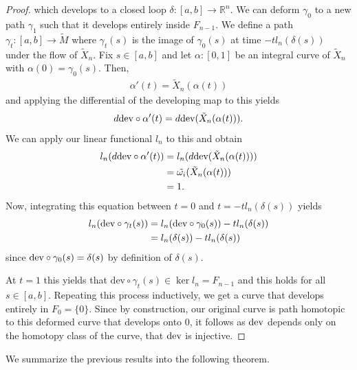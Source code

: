 \begin{proof}
    which develops to a closed loop $\delta: [a,b] \to \mathbb{R}^n$. We can deform
    $\gamma_0$ to a new path $\gamma_1$ such that it develops entirely inside
    $F_{n-1}$. We define a path $\gamma_t : [a,b] \to \tilde{M}$ where
    $\gamma_t(s)$ is the image of $\gamma_0(s)$ at time $-tl_n(\delta(s))$ under
    the flow of $\tilde{X}_n$. Fix $s \in [a,b]$ and let $\alpha: [0,1]$ be an
    integral curve of $\tilde{X}_n$ with $\alpha(0) = \gamma_0(s)$. Then,
    \begin{align*}
        \alpha'(t) = \tilde{X}_n(\alpha(t))
    \end{align*}
    and applying the differential of the developing map to this yields
    \begin{align*}
        d\text{dev} \circ \alpha' (t) = d \text{dev}(\tilde{X}_n(\alpha(t))).
    \end{align*}
    We can apply our linear functional $l_n$ to this and obtain
    \begin{align*}
        l_n(d\text{dev} \circ \alpha' (t) ) & = l_n(d \text{dev}(\tilde{X}_n(\alpha(t))))      \\
                                      & = \tilde{\omega_i}(\tilde{X}_n(\alpha(t))) \\
                                      & = 1.
    \end{align*}
    Now, integrating this equation between $t=0$ and $t = -tl_n(\delta(s))$ yields
    \begin{align*}
        l_n(\text{dev} \circ \gamma_t(s)) & = l_n(\text{dev} \circ \gamma_0(s)) - tl_n(\delta(s)) \\
                                    & = l_n(\delta(s)) - tl_n(\delta(s))
    \end{align*}
    since $\text{dev} \circ \gamma_0(s) = \delta(s)$ by definition of $\delta(s)$.

    At $t=1$ this yields that $\text{dev}\circ \gamma_t(s) \in \ker l_n = F_{n-1}$
    and this holds for all $s \in [a,b]$. Repeating this process inductively, we
    get a curve that develops entirely in $F_0 = \{0\}$. Since by construction, our
    original curve is path homotopic to this deformed curve that develops onto $0$,
    it follows as $\text{dev}$ depends only on the homotopy class of the curve, that
    $\text{dev}$ is injective.
\end{proof}

We summarize the previous results into the following theorem.

